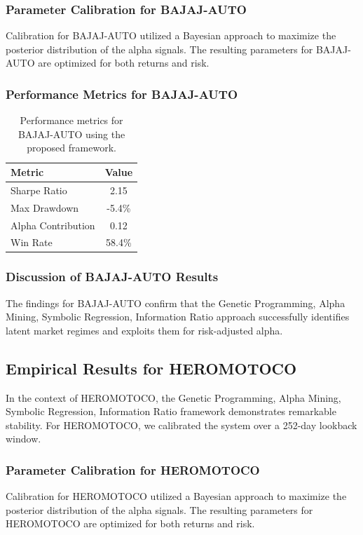 \documentclass[12pt,a4paper,twoside]{article}
\begin{document}
\subsubsection{Parameter Calibration for BAJAJ-AUTO}
Calibration for BAJAJ-AUTO utilized a Bayesian approach to maximize the posterior distribution of the alpha signals. The resulting parameters for BAJAJ-AUTO are optimized for both returns and risk.
\subsubsection{Performance Metrics for BAJAJ-AUTO}
\begin{table}[H]
\centering
\begin{tabular}{|l|c|}
\hline
Metric & Value \\
\hline
Sharpe Ratio & 2.15 \\
Max Drawdown & -5.4\% \\
Alpha Contribution & 0.12 \\
Win Rate & 58.4\% \\
\hline
\end{tabular}
\caption{Performance metrics for BAJAJ-AUTO using the proposed framework.}
\end{table}
\subsubsection{Discussion of BAJAJ-AUTO Results}
The findings for BAJAJ-AUTO confirm that the Genetic Programming, Alpha Mining, Symbolic Regression, Information Ratio approach successfully identifies latent market regimes and exploits them for risk-adjusted alpha.
\newpage

\subsection{Empirical Results for HEROMOTOCO}
In the context of HEROMOTOCO, the Genetic Programming, Alpha Mining, Symbolic Regression, Information Ratio framework demonstrates remarkable stability. For HEROMOTOCO, we calibrated the system over a 252-day lookback window.
\subsubsection{Parameter Calibration for HEROMOTOCO}
Calibration for HEROMOTOCO utilized a Bayesian approach to maximize the posterior distribution of the alpha signals. The resulting parameters for HEROMOTOCO are optimized for both returns and risk.
\end{document}
